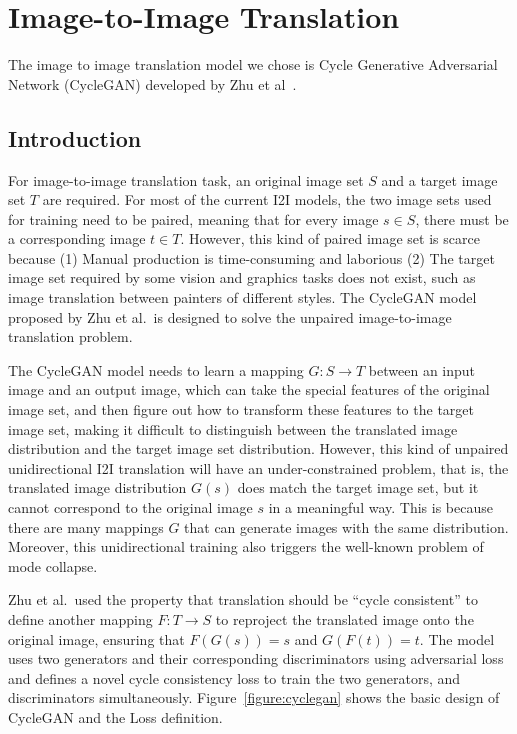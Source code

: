 \section{Image-to-Image Translation}
The image to image translation model we chose is Cycle Generative Adversarial Network (CycleGAN) developed by Zhu et al~\cite{zhu2017unpaired}.

\subsection{Introduction}
For image-to-image translation task, an original image set $S$ and a target image set $T$ are required. For most of the current I2I models, the two image sets used for training need to be paired, meaning that for every image $s \in S$, there must be a corresponding image $t \in T$. However, this kind of paired image set is scarce because (1) Manual production is time-consuming and laborious (2) The target image set required by some vision and graphics tasks does not exist, such as image translation between painters of different styles. The CycleGAN model proposed by Zhu et al.\ is designed to solve the unpaired image-to-image translation problem. 

The CycleGAN model needs to learn a mapping $G: S \rightarrow T$ between an input image and an output image, which can take the special features of the original image set, and then figure out how to transform these features to the target image set, making it difficult to distinguish between the translated image distribution and the target image set distribution. However, this kind of unpaired unidirectional I2I translation will have an under-constrained problem, that is, the translated image distribution $G(s)$ does match the target image set, but it cannot correspond to the original image $s$ in a meaningful way. This is because there are many mappings $G$ that can generate images with the same distribution. Moreover, this unidirectional training also triggers the well-known problem of mode collapse.

Zhu et al.\ used the property that translation should be ``cycle consistent'' to define another mapping $F: T \rightarrow S$ to reproject the translated image onto the original image, ensuring that $F(G(s))=s$ and $G(F(t))=t$. The model uses two generators and their corresponding discriminators using adversarial loss and defines a novel cycle consistency loss to train the two generators, and discriminators simultaneously. Figure~\ref{figure:cyclegan} shows the basic design of CycleGAN and the Loss definition.

